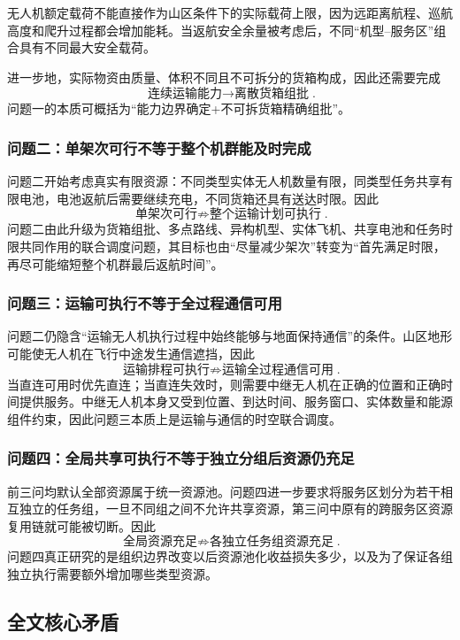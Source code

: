 \documentclass[UTF8,a4paper,12pt]{ctexart}
\begin{document}
无人机额定载荷不能直接作为山区条件下的实际载荷上限，因为远距离航程、巡航高度和爬升过程都会增加能耗。当返航安全余量被考虑后，不同“机型--服务区”组合具有不同最大安全载荷。

进一步地，实际物资由质量、体积不同且不可拆分的货箱构成，因此还需要完成
\[
\boxed{
\text{连续运输能力}
\rightarrow
\text{离散货箱组批}
}.
\]
问题一的本质可概括为“能力边界确定+不可拆货箱精确组批”。

\subsubsection{问题二：单架次可行不等于整个机群能及时完成}

问题二开始考虑真实有限资源：不同类型实体无人机数量有限，同类型任务共享有限电池，电池返航后需要继续充电，不同货箱还具有送达时限。因此
\[
\boxed{
\text{单架次可行}
\not\Rightarrow
\text{整个运输计划可执行}
}.
\]
问题二由此升级为货箱组批、多点路线、异构机型、实体飞机、共享电池和任务时限共同作用的联合调度问题，其目标也由“尽量减少架次”转变为“首先满足时限，再尽可能缩短整个机群最后返航时间”。

\subsubsection{问题三：运输可执行不等于全过程通信可用}

问题二仍隐含“运输无人机执行过程中始终能够与地面保持通信”的条件。山区地形可能使无人机在飞行中途发生通信遮挡，因此
\[
\boxed{
\text{运输排程可执行}
\not\Rightarrow
\text{运输全过程通信可用}
}.
\]
当直连可用时优先直连；当直连失效时，则需要中继无人机在正确的位置和正确时间提供服务。中继无人机本身又受到位置、到达时间、服务窗口、实体数量和能源组件约束，因此问题三本质上是运输与通信的时空联合调度。

\subsubsection{问题四：全局共享可执行不等于独立分组后资源仍充足}

前三问均默认全部资源属于统一资源池。问题四进一步要求将服务区划分为若干相互独立的任务组，一旦不同组之间不允许共享资源，第三问中原有的跨服务区资源复用链就可能被切断。因此
\[
\boxed{
\text{全局资源充足}
\not\Rightarrow
\text{各独立任务组资源充足}
}.
\]
问题四真正研究的是组织边界改变以后资源池化收益损失多少，以及为了保证各组独立执行需要额外增加哪些类型资源。

\subsection{全文核心矛盾}
\end{document}
